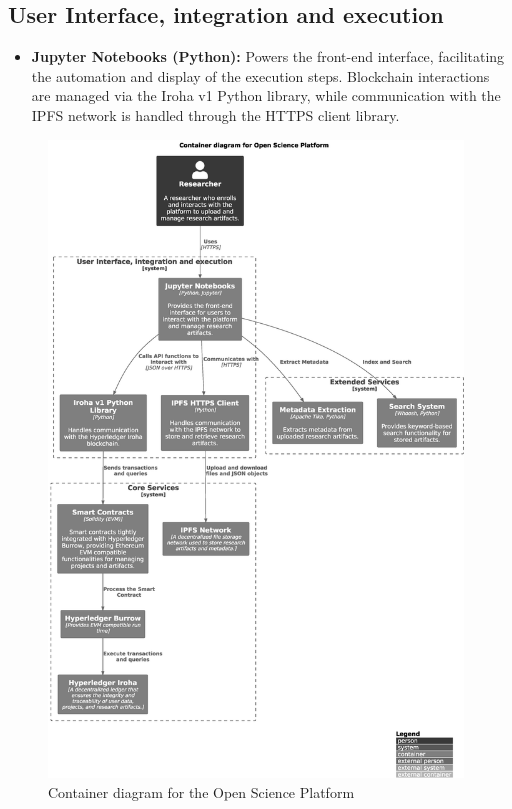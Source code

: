 \documentclass{article}
\begin{document}
\subsection{User Interface, integration and execution}

\begin{itemize}
      \item \textbf{Jupyter Notebooks (Python):} Powers the front-end interface, facilitating the automation and display of the execution steps. Blockchain interactions are managed via the Iroha v1 Python library, while communication with the IPFS network is handled through the HTTPS client library.
\end{itemize}

\begin{figure}[htbp]
      \centering
      \includegraphics[width=0.98\textwidth, keepaspectratio]{c4_container_diagram}
      \caption{Container diagram for the Open Science Platform}
      \label{fig:c4_container_diagram}
\end{figure}
\end{document}
